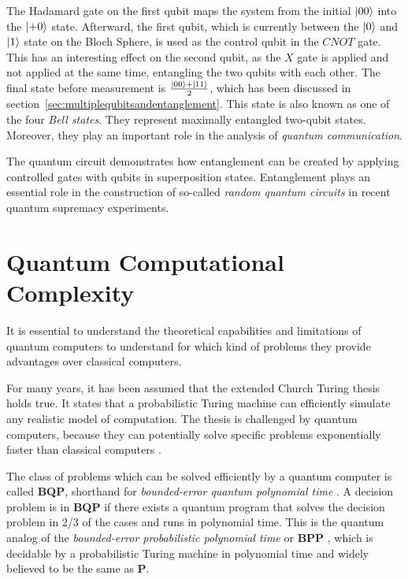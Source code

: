 The Hadamard gate on the first qubit maps the system from the initial $\Ket{00}$
into the $\Ket{+0}$ state. Afterward, the first qubit, which is currently
between the $\Ket{0}$ and $\Ket{1}$ state on the Bloch Sphere, is used as the
control qubit in the $CNOT$ gate. This has an interesting effect on the second qubit,
as the $X$ gate is applied and not applied at the same time, entangling
the two qubits with each other. The final state before measurement is
$\frac{\Ket{00} + \Ket{11}}{2}$, which has been discussed in section~\ref{sec:multiplequbitsandentanglement}.
This state is also known as one of the four \textit{Bell states}. They represent maximally
entangled two-qubit states. Moreover, they play an important role in the analysis of
\textit{quantum communication}.

The quantum circuit demonstrates how entanglement can be created by applying controlled gates with qubits in superposition states.
Entanglement plays an essential role in the construction of so-called \textit{random
quantum circuits} in recent quantum supremacy experiments.


\section{Quantum Computational Complexity}

It is essential to understand the theoretical capabilities and limitations of quantum computers to understand for which kind of problems
they provide advantages over classical computers. 

For many years, it has been assumed that the extended Church Turing thesis holds true. It states that a probabilistic
Turing machine can efficiently simulate any realistic model of computation. The thesis is challenged by quantum computers, because they can potentially solve specific problems exponentially faster than classical computers \cite{feynman1982simulating}.

The class of problems which can be solved efficiently by a quantum
computer is called \textbf{BQP}, shorthand for \textit{bounded-error quantum
  polynomial time} \cite{Bernstein93quantumcomplexity}. A decision problem is in \textbf{BQP} if there exists a quantum
program that solves the decision problem in 2/3 of the cases and runs in
polynomial time. This is the quantum analog of the \textit{bounded-error
  probabilistic polynomial time} or \textbf{BPP} \cite{gill1977computational}, which is decidable by a
probabilistic Turing machine in polynomial time and widely believed to be the same as
\textbf{P}.

